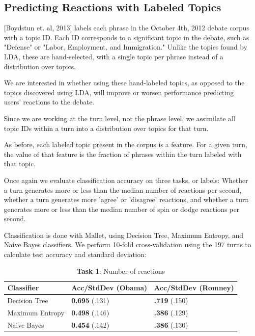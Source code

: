 

\subsection{Predicting Reactions with Labeled Topics}

[Boydstun et. al, 2013] labels each phrase in the October 4th, 2012 debate corpus with a topic ID. Each ID corresponds to a significant topic in the debate, such as "Defense" or "Labor, Employment, and Immigration." Unlike the topics found by LDA, these are hand-selected, with a single topic per phrase instead of a distribution over topics.

We are interested in whether using these hand-labeled topics, as opposed to the topics discovered using LDA, will improve or worsen performance predicting users' reactions to the debate.

Since we are working at the turn level, not the phrase level, we assimilate all topic IDs within a turn into a distribution over topics for that turn.

As before, each labeled topic present in the corpus is a feature. For a given turn, the value of that feature is the fraction of phrases within the turn labeled with that topic.

Once again we evaluate classification accuracy on three tasks, or labels: Whether a turn generates more or less than the median number of reactions per second, whether a turn generates more 'agree' or 'disagree' reactions, and whether a turn generates more or less than the median number of spin or dodge reactions per second.

Classification is done with Mallet, using Decision Tree, Maximum Entropy, and Naive Bayes classifiers. We perform 10-fold cross-validation using the 197 turns to calculate test accuracy and standard deviation:

\begin{table}[H]
\begin{centering}
\begin{tabular}{ l | l | l }
Classifier & Acc/StdDev (Obama) & Acc/StdDev (Romney) \\
\hline
Decision Tree & \textbf{0.695} (.131) &  \textbf{.719} (.150) \\
Maximum Entropy & \textbf{0.498} (.146) &  \textbf{.386} (.129) \\
Naive Bayes & \textbf{0.454} (.142) &  \textbf{.386} (.130) \\
\end{tabular}
\caption{\textbf{Task 1}: Number of reactions}
\end{centering}
\end{table}

